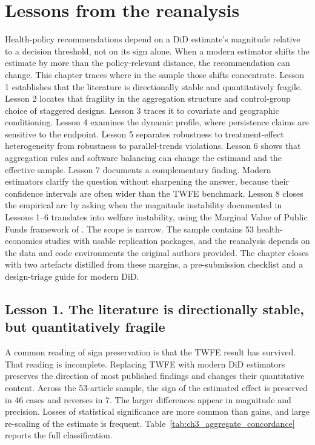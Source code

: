 \chapter{Lessons from the reanalysis}
\label{Chapter4}

Health-policy recommendations depend on a DiD estimate's magnitude relative to a decision threshold, not on its sign alone. When a modern estimator shifts the estimate by more than the policy-relevant distance, the recommendation can change. This chapter traces where in the sample those shifts concentrate. Lesson 1 establishes that the literature is directionally stable and quantitatively fragile. Lesson 2 locates that fragility in the aggregation structure and control-group choice of staggered designs. Lesson 3 traces it to covariate and geographic conditioning. Lesson 4 examines the dynamic profile, where persistence claims are sensitive to the endpoint. Lesson 5 separates robustness to treatment-effect heterogeneity from robustness to parallel-trends violations. Lesson 6 shows that aggregation rules and software balancing can change the estimand and the effective sample. Lesson 7 documents a complementary finding. Modern estimators clarify the question without sharpening the answer, because their confidence intervals are often wider than the TWFE benchmark. Lesson 8 closes the empirical arc by asking when the magnitude instability documented in Lessons 1--6 translates into welfare instability, using the Marginal Value of Public Funds framework of \textcite{hendren2020unified}. The scope is narrow. The sample contains 53 health-economics studies with usable replication packages, and the reanalysis depends on the data and code environments the original authors provided. The chapter closes with two artefacts distilled from these margins, a pre-submission checklist and a design-triage guide for modern DiD.

\section{Lesson 1. The literature is directionally stable, but quantitatively fragile}

A common reading of sign preservation is that the TWFE result has survived. That reading is incomplete. Replacing TWFE with modern DiD estimators preserves the direction of most published findings and changes their quantitative content. Across the 53-article sample, the sign of the estimated effect is preserved in 46 cases and reverses in 7. The larger differences appear in magnitude and precision. Losses of statistical significance are more common than gains, and large re-scaling of the estimate is frequent. Table~\ref{tab:ch3_aggregate_concordance} reports the full classification.

